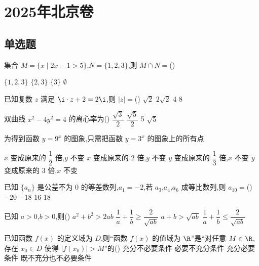 \chapter{2025年北京卷}
\section{单选题}

\begin{problem}
集合 \(M = \{x\mid 2x - 1 > 5\}\),\(N=\{1,2,3\}\),则 \(M\cap N=\)(\quad)

\choices
    {\(\{1,2,3\}\)}
    {\(\{2,3\}\)}
    {\(\{3\}\)}
    {\(\emptyset\)}
\end{problem}

\begin{problem}
已知复数 \(z\) 满足 \(\i\cdot z +2 = 2\i\),则 \(|z| =\)(\quad)
\choices
    {\(\sqrt{2}\)}
    {\(2\sqrt{2}\)}
    {4}
    {8}
\end{problem}

\begin{problem}
双曲线 \(x^2-4y^2=4\) 的离心率为(\quad)
\choices
    {\(\dfrac{\sqrt{3}}{2}\)}
    {\(\dfrac{\sqrt{5}}{2}\)}
    {5}
    {\(\sqrt{5}\)}
\end{problem}

\begin{problem}
为得到函数 \(y=9^x\) 的图象,只需把函数 \(y=3^x\) 的图象上的所有点

\choices
    {\(x\) 变成原来的 \(\dfrac12\) 倍,\(y\) 不变}
    {\(x\) 变成原来的 \(2\) 倍,\(y\) 不变}
    {\(y\) 变成原来的 \(\dfrac13\) 倍,\(x\) 不变}
    {\(y\) 变成原来的 \(3\) 倍,\(x\) 不变}
\end{problem}

\begin{problem}
已知 \(\{a_n\}\) 是公差不为 0 的等差数列,\(a_1=-2\),若 \(a_3\),\(a_4\),\(a_6\) 成等比数列,则 \(a_{10}=\)(\quad)
\choices
    {\(-20\)}
    {\(-18\)}
    {16}
    {18}
\end{problem}

\begin{problem}
已知 \(a>0\),\(b>0\),则(\quad)
\choices
    {\(a^2+b^2>2ab\)}
    {\(\dfrac{1}{a}+\dfrac{1}{b}\ge \dfrac{2}{\sqrt{ab}}\)}
    {\(a+b>\sqrt{ab}\)}
    {\(\dfrac{1}{a}+\dfrac{1}{b}\le \dfrac{2}{\sqrt{ab}}\)}
\end{problem}

\begin{problem}
已知函数 \(f(x)\) 的定义域为 \(D\),则``函数 \(f(x)\) 的值域为 \(\R\)''是``对任意 \(M\in\R\),存在 \(x_0\in D\) 使得 \(|f(x_0)|>M\)''的(\quad)
\choices
    {充分不必要条件}
    {必要不充分条件}
    {充分必要条件}
    {既不充分也不必要条件}
\end{problem}

